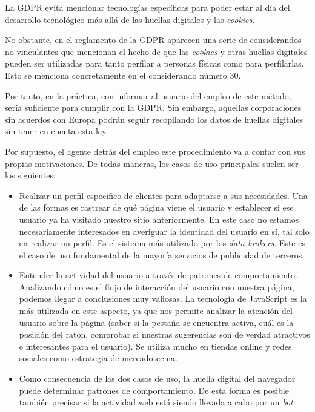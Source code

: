 La GDPR evita mencionar tecnologías específicas para poder estar al día del desarrollo tecnológico más allá de las huellas digitales y las \textit{cookies}\cite{gdpr_eff}. \par 

No obstante, en el reglamento de la GDPR aparecen una serie de considerandos no vinculantes que mencionan el hecho de que las \textit{cookies} y otras huellas digitales pueden ser utilizadas para tanto perfilar a personas físicas como para perfilarlas. Esto se menciona concretamente en el considerando número 30\cite{gdpr}. \par 

Por tanto, en la práctica, con informar al usuario del empleo de este método, sería suficiente para cumplir con la GDPR\cite{blokt}. Sin embargo, aquellas corporaciones sin acuerdos con Europa podrán seguir recopilando los datos de huellas digitales sin tener en cuenta esta ley. \par

Por supuesto, el agente detrás del empleo este procedimiento va a contar con sus propias motivaciones. De todas maneras, los casos de uso principales suelen ser los siguientes: \par

\begin{itemize}
	\item Realizar un perfil específico de clientes para adaptarse a sus necesidades. Una de las formas es rastrear de qué página viene el usuario y establecer si ese usuario ya ha visitado nuestro sitio anteriormente. En este caso no estamos necesariamente interesados en averiguar la identidad del usuario en sí, tal solo en realizar un perfil. Es el sistema más utilizado por los \textit{data brokers}\cite{data_brocker}. Este es el caso de uso fundamental de la mayoría servicios de publicidad de terceros. \par 
	
	\item Entender la actividad del usuario a través de patrones de comportamiento. Analizando cómo es el flujo de interacción del usuario con nuestra página, podemos llegar a conclusiones muy valiosas. La tecnología de JavaScript es la más utilizada en este aspecto, ya que nos permite analizar la atención del usuario sobre la página (saber si la pestaña se encuentra activa, cuál es la posición del ratón, comprobar si nuestras sugerencias son de verdad atractivos e interesantes para el usuario). Se utiliza mucho en tiendas online y redes sociales como estrategia de mercadotecnia. \par 
	
	\item Como consecuencia de los dos casos de uso, la huella digital del navegador puede determinar patrones de comportamiento. De esta forma es posible también precisar si la actividad web está siendo llevada a cabo por un \textit{bot}\cite{bot_paper}. \par 
\end{itemize}

